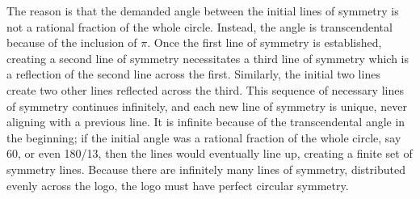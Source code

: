 \documentclass{article}
\begin{document}
The reason is that the demanded angle between the initial lines of symmetry is not a rational fraction of the whole circle.
Instead, the angle is transcendental because of the inclusion of $\pi$.
Once the first line of symmetry is established, creating a second line of symmetry necessitates a third line of symmetry which is a reflection of the second line across the first.
Similarly, the initial two lines create two other lines reflected across the third.
This sequence of necessary lines of symmetry continues infinitely, and each new line of symmetry is unique, never aligning with a previous line.
It is infinite because of the transcendental angle in the beginning; if the initial angle was a rational fraction of the whole circle, say 60\textdegree, or even 180\textdegree/13, then the lines would eventually line up, creating a finite set of symmetry lines.
Because there are infinitely many lines of symmetry, distributed evenly across the logo, the logo must have perfect circular symmetry.
\end{document}

